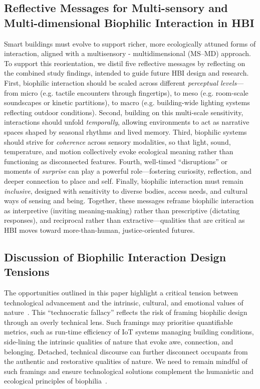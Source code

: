 \subsection{Reflective Messages for Multi-sensory and Multi-dimensional Biophilic Interaction in HBI}
Smart buildings must evolve to support richer, more ecologically attuned forms of interaction, aligned with a multisensory - multidimensional (MS–MD) approach. To support this reorientation, we distil five reflective messages by reflecting on the combined study findings, intended to guide future HBI design and research. First, biophilic interaction should be scaled across different \emph{perceptual levels}---from micro (e.g. tactile encounters through fingertips), to meso (e.g. room-scale soundscapes or kinetic partitions), to macro (e.g. building-wide lighting systems reflecting outdoor conditions). Second, building on this multi-scale sensitivity, interactions should unfold \emph{temporally}, allowing environments to act as narrative spaces shaped by seasonal rhythms and lived memory. Third, biophilic systems should strive for \emph{coherence} across sensory modalities, so that light, sound, temperature, and motion collectively evoke ecological meaning rather than functioning as disconnected features. Fourth, well-timed ``disruptions'' or moments of \emph{surprise} can play a powerful role—fostering curiosity, reflection, and deeper connection to place and self. Finally, biophilic interaction must remain \emph{inclusive}, designed with sensitivity to diverse bodies, access needs, and cultural ways of sensing and being. Together, these messages reframe biophilic interaction as interpretive (inviting meaning-making) rather than prescriptive (dictating responses), and reciprocal rather than extractive---qualities that are critical as HBI moves toward more-than-human, justice-oriented futures.


\subsection{Discussion of Biophilic Interaction Design Tensions}
The opportunities outlined in this paper highlight a critical tension between technological advancement and the intrinsic, cultural, and emotional values of nature~\cite{gunderson2014social}. This ``technocratic fallacy'' reflects the risk of framing biophilic design through an overly technical lens. Such framings may prioritise quantifiable metrics, such as run-time efficiency of IoT systems managing building conditions, side-lining the intrinsic qualities of nature that evoke awe, connection, and belonging. Detached, technical discourse can further disconnect occupants from the authentic and restorative qualities of nature. We need to remain mindful of such framings and ensure technological solutions complement the humanistic and ecological principles of biophilia~\cite{kellert1995biophilia, wilson1986biophilia, kellert2018nature}.

